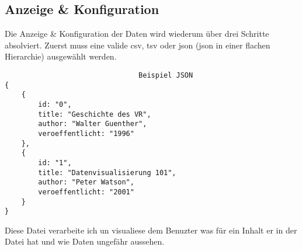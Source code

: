 \subsection{Anzeige \& Konfiguration}
Die Anzeige \& Konfiguration der Daten wird wiederum über drei Schritte absolviert. Zuerst muss eine valide csv, tsv oder json (json in einer
flachen Hierarchie) ausgewählt werden.
\begin{lstlisting}
                                Beispiel JSON
{
    {
        id: "0",
        title: "Geschichte des VR",
        author: "Walter Guenther",
        veroeffentlicht: "1996"
    },
    {
        id: "1",
        title: "Datenvisualisierung 101",
        author: "Peter Watson",
        veroeffentlicht: "2001"
    }
}
\end{lstlisting}
Diese Datei verarbeite ich un visualiese dem Benuzter was für ein Inhalt er in der Datei hat und wie Daten ungefähr aussehen.

